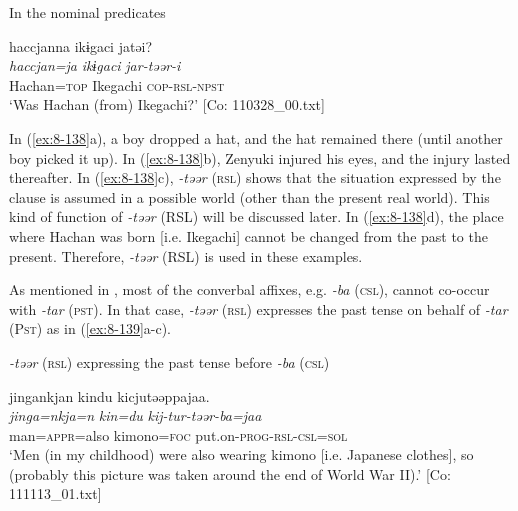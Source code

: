   In the nominal predicates

\ex
{\US}
\glll   haccjanna  ikɨgaci  jatəi?\\
\textit{haccjan=ja}  \textit{ikɨgaci}  \textit{jar-təər-i}\\
Hachan=\textsc{top}  Ikegachi  \textsc{cop}-\textsc{rsl}-\textsc{npst}\\
\glt ‘Was Hachan (from) Ikegachi?’ [Co: 110328\_00.txt]
\z
\z

In (\ref{ex:8-138}a), a boy dropped a hat, and the hat remained there (until another boy picked it up). In (\ref{ex:8-138}b), Zenyuki injured his eyes, and the injury lasted thereafter. In (\ref{ex:8-138}c), \textit{-təər} (\textsc{rsl}) shows that the situation expressed by the clause is assumed in a possible world (other than the present real world). This kind of function of \textit{-təər} (RSL) will be discussed later. In (\ref{ex:8-138}d), the place where Hachan was born [i.e. Ikegachi] cannot be changed from the past to the present. Therefore, \textit{-təər} (RSL) is used in these examples.

  As mentioned in , most of the converbal affixes, e.g. \textit{-ba} (\textsc{csl}), cannot co-occur with \textit{-tar} (\textsc{pst}). In that case, \textit{-təər} (\textsc{rsl}) expresses the past tense on behalf of \textit{-tar} (P\textsc{st}) as in (\ref{ex:8-139}a-c).

\ea\label{ex:8-139}
  \textit{-təər} (\textsc{rsl}) expressing the past tense before \textit{-ba} (\textsc{csl})


{\TM}
\glll  jingankjan  kindu  kicjutəəppajaa.\\
\textit{jinga=nkja=n}  \textit{kin=du}  \textit{kij-tur-təər-ba=jaa}\\
man=\textsc{appr}=also  kimono=\textsc{foc}  put.on-\textsc{prog}-\textsc{rsl}-\textsc{csl}=\textsc{sol}\\
\glt ‘Men (in my childhood) were also wearing kimono [i.e. Japanese clothes], so (probably this picture was taken around the end of World War II).’ [Co: 111113\_01.txt]

